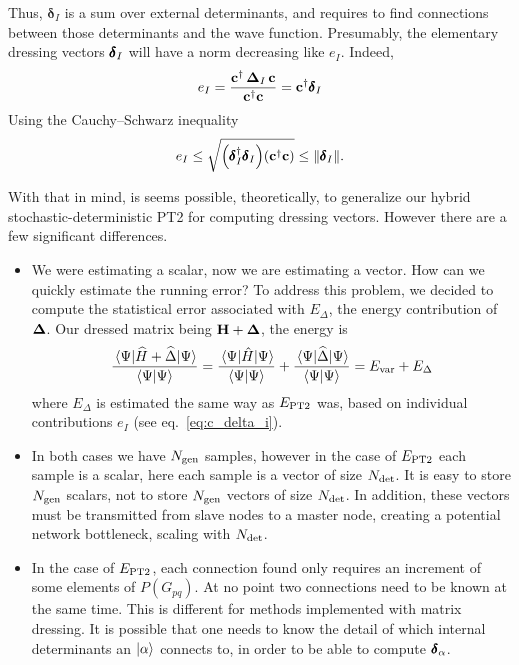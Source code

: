 \documentclass[./thesis.tex]{subfiles}
\begin{document}
Thus, ${\pmb \delta}_I$ is a sum over external determinants, and requires to find connections between those determinants and the wave function. Presumably, the elementary dressing vectors $\pmb \delta_I$ will have a norm decreasing like $e_I$. Indeed, 
\begin{equation}
e_I = \frac{{\bf c}^\dagger\, {\bf \Delta}_I\, {\bf c}}{{\bf c}^\dagger {\bf c}} = {\bf c}^\dagger \pmb \delta_I
\label{eq:c_delta_i}
\end{equation}
Using the Cauchy–Schwarz inequality
\begin{equation}
e_I \le \sqrt{ \qty (\pmb \delta_I^\dagger \pmb \delta_I) \qty({\bf c}^\dagger {\bf c}) } \le
\norm{\pmb \delta_I}.
\end{equation}

With that in mind, is seems possible, theoretically, to generalize our hybrid stochastic-deterministic PT2 for computing dressing vectors.
However there are a few significant differences.
\begin{itemize}
\item
We were estimating a scalar, now we are estimating a vector. How can we quickly estimate the running error?
To address this problem, we decided to compute the statistical error associated with $E_{\Delta}$, the energy contribution of ${\bf \Delta}$. Our dressed matrix being $\mathbf{H} + {\bf \Delta}$, the energy is
\begin{equation}
\frac{\mel{\Psi}{\widehat{H} + \widehat{\Delta}}{\Psi}}{\braket{\Psi}{\Psi}} =
\frac{ \mel{\Psi}{\hat{H}}{\Psi}}{\braket{\Psi}{\Psi}} + \frac{\mel{\Psi}{\widehat{\Delta}}{\Psi}}{\braket{\Psi}{\Psi}} = E_\text{var} + E_{\Delta} 
\end{equation}
where $E_{\Delta}$ is estimated the same way as $E_\text{PT2}$ was, based on individual contributions $e_I$ (see eq.~\eqref{eq:c_delta_i}).
\item
In both cases we have ${N_\text{gen}}$ samples, however in the case of $E_\text{PT2}$ each sample is a scalar, here each sample is a vector of size ${N_\text{det}}$. It is easy to store ${N_\text{gen}}$ scalars, not to store ${N_\text{gen}}$ vectors of size ${N_\text{det}}$. In addition, these vectors must be transmitted from slave nodes to a master node, creating a potential network bottleneck, scaling with ${N_\text{det}}$.
\item
In the case of $E_\text{PT2}$, each connection found only requires an increment of some elements of $P(G_{pq})$. At no point two connections need to be known at the same time. This is different for methods implemented with matrix dressing. It is possible that one needs to know the detail of which internal determinants an $\ket \alpha$ connects to, in order to be able to compute $\pmb \delta_\alpha$.
\end{itemize}
\end{document}
